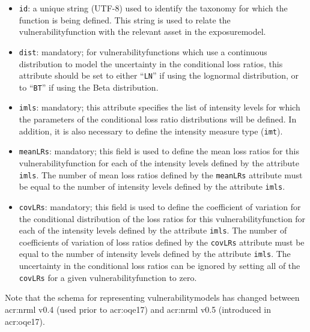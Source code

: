 \begin{itemize}

    \item \Verb+id+: a unique string (UTF-8) used to identify the \gls{taxonomy} for 
    which the function is being defined. This string is used to relate the 
    \gls{vulnerabilityfunction} with the relevant \gls{asset} in the 
    \gls{exposuremodel}.

    \item \Verb+dist+: mandatory; for \glspl{vulnerabilityfunction} which use a continuous 
    distribution to model the uncertainty in the conditional loss ratios, 
    this attribute should be set to either ``\Verb+LN+'' if using the lognormal
    distribution, or to ``\Verb+BT+'' if using the Beta distribution.

    \item \Verb+imls+: mandatory; this attribute specifies the list of intensity levels
    for which the parameters of the conditional loss ratio distributions will
    be defined. In addition, it is also necessary to define the intensity 
    measure type (\Verb+imt+).

    \item \Verb+meanLRs+: mandatory; this field is used to define the mean loss ratios
    for this \gls{vulnerabilityfunction} for each of the intensity levels
    defined by the attribute \Verb+imls+. The number of mean loss ratios
    defined by the \Verb+meanLRs+ attribute must be equal to the number of
    intensity levels defined by the attribute \Verb+imls+.

    \item \Verb+covLRs+: mandatory; this field is used to define the coefficient of 
    variation for the conditional distribution of the loss ratios for this
    \gls{vulnerabilityfunction} for each of the intensity levels defined by
    the attribute \Verb+imls+. The number of coefficients of variation of loss
    ratios defined by the \Verb+covLRs+ attribute must be equal to the number
    of intensity levels defined by the attribute \Verb+imls+. The uncertainty
    in the conditional loss ratios can be ignored by setting all of the
    \Verb+covLRs+ for a given \gls{vulnerabilityfunction} to zero.

\end{itemize}


Note that the schema for representing \glspl{vulnerabilitymodel} has changed
between \gls{acr:nrml} v0.4 (used prior to \gls{acr:oqe17}) and \gls{acr:nrml}
v0.5 (introduced in \gls{acr:oqe17}).

